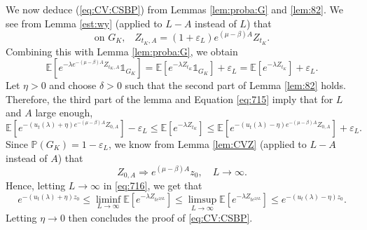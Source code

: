\documentclass[11pt]{article}
\theoremstyle{plain}
\newcommand\vep{\varepsilon}
\begin{document}
We now deduce (\ref{eq:CV:CSBP}) from Lemmas \ref{lem:proba:G} and \ref{lem:82}.
We see from  Lemma \ref{est:wy} (applied to $L-A$ instead of $L$) that
\begin{equation*}
\text{on $G_K$,}\quad Z_{t_K,A}=(1+\vep_L)e^{(\mu-\beta)A}Z_{t_K}.
\end{equation*}
Combining this with Lemma  \ref{lem:proba:G}, we obtain
\begin{equation}
\mathbb{E}\left[e^{-\lambda e^{-(\mu-\beta)A} Z_{t_K,A}}\mathbb{1}_{G_K}\right]=\mathbb{E}\left[e^{-\lambda Z_{t_K}}\mathbb{1}_{G_K}\right]+\vep_L=\mathbb{E}\left[e^{-\lambda Z_{t_K}}\right]+\vep_L. \label{eq:715}
\end{equation}
Let $\eta>0$ and choose $\delta>0$ such that the second part of Lemma \ref{lem:82} holds. Therefore, the third part of the lemma and Equation \eqref{eq:715} imply that for $L$ and $A$ large enough,
\begin{equation}\label{eq:716}
\mathbb{E}\left[e^{-(u_t(\lambda)+\eta)e^{-(\mu-\beta)A}Z_{0,A}}\right]-\vep_L\leqslant\mathbb{E}\left[e^{-\lambda Z_{t_K}}\right]\leqslant \mathbb{E}\left[e^{-(u_t(\lambda)-\eta)e^{-(\mu-\beta)A}Z_{0,A}}\right]+\vep_L.
\end{equation}
Since $\mathbb{P}(G_K)=1-\vep_L$, we know from Lemma \ref{lem:CVZ} (applied to $L-A$ instead of $A$) that
\begin{equation*}
Z_{0,A}\Rightarrow e^{(\mu-\beta)A}z_0, \quad L\to\infty.
\end{equation*}
Hence, letting $L\to\infty$ in \eqref{eq:716}, we get that 
\begin{equation*}
e^{-(u_t(\lambda)+\eta)z_0}\leqslant \liminf\limits_{L\rightarrow\infty}\mathbb{E}\left[e^{-\lambda Z_{te^{2\beta L}}}\right]\leqslant \limsup\limits_{L\rightarrow\infty}\mathbb{E}\left[e^{-\lambda Z_{te^{2\beta L}}}\right]\leqslant e^{-(u_t(\lambda)-\eta)z_0}.
\end{equation*}
Letting $\eta\to0$ then concludes the proof of \eqref{eq:CV:CSBP}.
 


\end{document}
